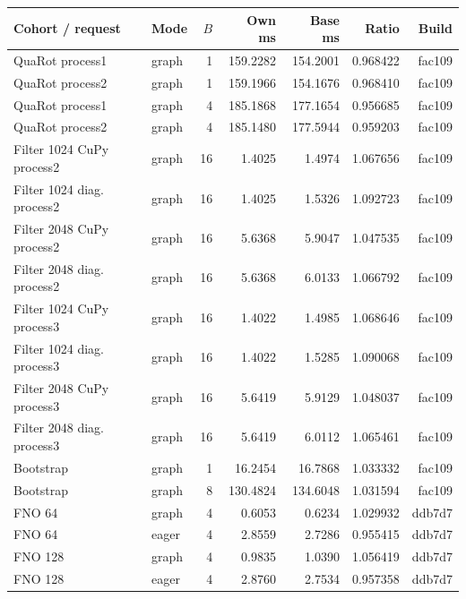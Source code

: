 \begin{tabular}{@{}llrrrrr@{}}
\toprule
Cohort / request & Mode & $B$ & Own ms & Base ms & Ratio & Build\\\midrule
QuaRot process1 & graph & 1 & 159.2282 & 154.2001 & 0.968422 & fac109\\
QuaRot process2 & graph & 1 & 159.1966 & 154.1676 & 0.968410 & fac109\\
QuaRot process1 & graph & 4 & 185.1868 & 177.1654 & 0.956685 & fac109\\
QuaRot process2 & graph & 4 & 185.1480 & 177.5944 & 0.959203 & fac109\\
Filter 1024 CuPy process2 & graph & 16 & 1.4025 & 1.4974 & 1.067656 & fac109\\
Filter 1024 diag. process2 & graph & 16 & 1.4025 & 1.5326 & 1.092723 & fac109\\
Filter 2048 CuPy process2 & graph & 16 & 5.6368 & 5.9047 & 1.047535 & fac109\\
Filter 2048 diag. process2 & graph & 16 & 5.6368 & 6.0133 & 1.066792 & fac109\\
Filter 1024 CuPy process3 & graph & 16 & 1.4022 & 1.4985 & 1.068646 & fac109\\
Filter 1024 diag. process3 & graph & 16 & 1.4022 & 1.5285 & 1.090068 & fac109\\
Filter 2048 CuPy process3 & graph & 16 & 5.6419 & 5.9129 & 1.048037 & fac109\\
Filter 2048 diag. process3 & graph & 16 & 5.6419 & 6.0112 & 1.065461 & fac109\\
Bootstrap & graph & 1 & 16.2454 & 16.7868 & 1.033332 & fac109\\
Bootstrap & graph & 8 & 130.4824 & 134.6048 & 1.031594 & fac109\\
FNO 64 & graph & 4 & 0.6053 & 0.6234 & 1.029932 & ddb7d7\\
FNO 64 & eager & 4 & 2.8559 & 2.7286 & 0.955415 & ddb7d7\\
FNO 128 & graph & 4 & 0.9835 & 1.0390 & 1.056419 & ddb7d7\\
FNO 128 & eager & 4 & 2.8760 & 2.7534 & 0.957358 & ddb7d7\\
\bottomrule
\end{tabular}
